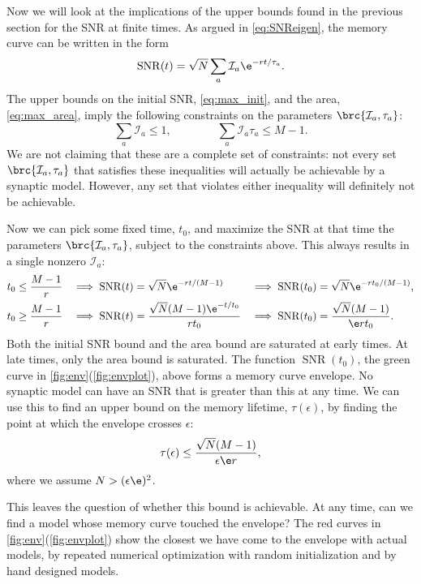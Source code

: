 \documentclass{article} %
\DeclareMathOperator{\snr}{SNR}
\newcommand{\CI}{\mathcal{I}}
\begin{document}
Now we will look at the implications of the upper bounds found in the previous section for the SNR at finite times.
As argued in \eqref{eq:SNReigen}, the memory curve can be written in the form
%
\begin{equation}\label{eq:SNRmodes}
  \snr(t) = \sqrt{N}\sum_a \CI_a \e^{-rt/\tau_a}.
\end{equation}
%
The upper bounds on the initial SNR, \eqref{eq:max_init}, and the area, \eqref{eq:max_area}, imply the following constraints on the parameters $\brc{\CI_a,\tau_a}$:
%
\begin{equation}\label{eq:modeconstr}
  \sum_a \CI_a \leq 1,
  \qquad\qquad
  \sum_a \CI_a \tau_a \leq M-1.
\end{equation}
%
We are not claiming that these are a complete set of constraints: not every set $\brc{\CI_a,\tau_a}$ that satisfies these inequalities will actually be achievable by a synaptic model.
However, any set that violates either inequality will definitely not be achievable.

Now we can pick some fixed time, $t_0$, and maximize the SNR at that time \wrt the parameters $\brc{\CI_a,\tau_a}$, subject to the constraints above.
This always results in a single nonzero $\CI_a$:
%
\begin{equation}\label{eq:env}
\begin{aligned}
  t_0 &\leq \frac{M-1}{r} &
   \implies
  \snr(t) &= \sqrt{N}\e^{-rt/(M-1)} &
   \implies
  \snr(t_0) &= \sqrt{N}\e^{-rt_0/(M-1)},\\
  t_0 &\geq \frac{M-1}{r} &
   \implies
  \snr(t) &= \frac{\sqrt{N}(M-1)\e^{-t/t_0}}{rt_0} &
   \implies
  \snr(t_0) &= \frac{\sqrt{N}(M-1)}{\e rt_0}.
\end{aligned}
\end{equation}
%
Both the initial SNR bound and the area bound are saturated at early times.
At late times, only the area bound is saturated.
The function $\snr(t_0)$, the green curve in \autoref{fig:env}(\ref{fig:envplot}), above forms a memory curve envelope.
No synaptic model can have an SNR that is greater than this at any time.
We can use this to find an upper bound on the memory lifetime, $\tau(\epsilon)$, by finding the point at which the envelope crosses $\epsilon$:
%
\begin{equation}\label{eq:lifebound}
  \tau(\epsilon) \leq \frac{\sqrt{N}(M-1)}{\epsilon\e r},
\end{equation}
%
where we assume $N>(\epsilon\e)^2$.

This leaves the question of whether this bound is achievable.
At any time, can we find a model whose memory curve touched the envelope?
The red curves in \autoref{fig:env}(\ref{fig:envplot}) show the closest we have come to the envelope with actual models, by repeated numerical optimization with random initialization and by hand designed models.
\end{document}

